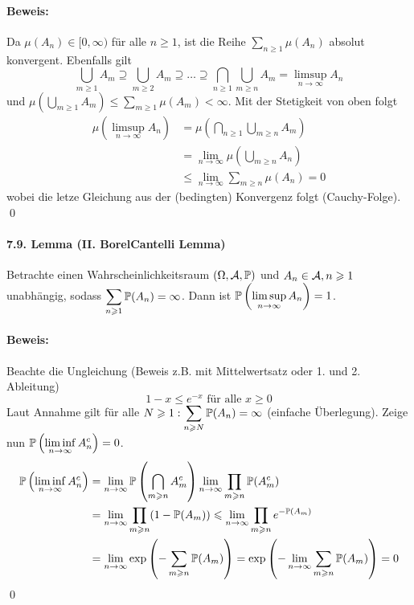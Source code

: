\documentclass[12pt]{report}
\begin{document}
\paragraph{Beweis:}Da $\mu(A_n)\in[0,\infty)$ f\"ur alle $n\geq1$, ist die Reihe $\displaystyle\sum_{n\geq1}\mu(A_n)$ absolut konvergent. Ebenfalls gilt 
$$\bigcup_{m\geq1}A_m\supseteq\bigcup_{m\geq2}A_m\supseteq\hdots\supseteq\bigcap_{n\geq1}\bigcup_{m\geq n}A_m=\limsup_{n\to\infty}A_n$$
und $\displaystyle\mu\left(\bigcup_{m\geq1}A_m\right)\leq\sum_{m\geq1}\mu(A_m)<\infty$. Mit der Stetigkeit von oben folgt
\begin{align*}
    \mu\left(\limsup_{n\to\infty}A_n\right)&=\mu\left(\bigcap_{n\geq1}\bigcup_{m\geq n}A_m\right)\\
    &=\lim_{n\to\infty}\mu\left(\bigcup_{m\geq n}A_n\right)\\
    &\leq\lim_{n\to\infty}\sum_{m\geq n}\mu(A_n)=0
\end{align*}
wobei die letze Gleichung aus der (bedingten) Konvergenz folgt (Cauchy-Folge). \qed

\paragraph{7.9. Lemma (II. Borel\textendash Cantelli Lemma)}Betrachte einen Wahrscheinlichkeitsraum $(\Omega, \mathcal{A}, \mathbb{P})$ und $A_n\in\mathcal{A},n\geqslant1$ unabh\"angig, sodass $\displaystyle\sum_{n\geqslant1}\mathbb{P}(A_n)=\infty$. Dann ist $\displaystyle\mathbb{P}\left(\limsup_{n\to\infty}A_n\right)=1$. 

\paragraph{Beweis:}Beachte die Ungleichung (Beweis z.B. mit Mittelwertsatz oder 1. und 2. Ableitung)
$$1-x\leq e^{-x}\text{ f\"ur alle }x\geq0$$
Laut Annahme gilt f\"ur alle $N\geqslant1:\displaystyle\sum_{n\geqslant N}\mathbb{P}(A_n)=\infty$ (einfache \"Uberlegung). Zeige nun $\displaystyle\mathbb{P}\left(\liminf_{n\to\infty}A_n^c\right)=\nobreak0$.
\begin{align*}
    \mathbb{P}\left(\liminf_{n\to\infty}A_n^c\right)&=\lim_{n\to\infty}\mathbb{P}\left(\bigcap_{m\geqslant n}A_m^c\right)\lim_{n\to\infty}\prod_{m\geqslant n}\mathbb{P}(A_m^c)\\
    &=\lim_{n\to\infty}\prod_{m\geqslant n}(1-\mathbb{P}(A_m))\leqslant\lim_{n\to\infty}\prod_{m\geqslant n}e^{-\mathbb{P}(A_m)}\\
    &=\lim_{n\to\infty}\exp\left(-\sum_{m\geqslant n}\mathbb{P}(A_m)\right)=\exp\left(-\lim_{n\to\infty}\sum_{m\geqslant n}\mathbb{P}(A_m)\right)=0
\end{align*}
\qed
\end{document}
